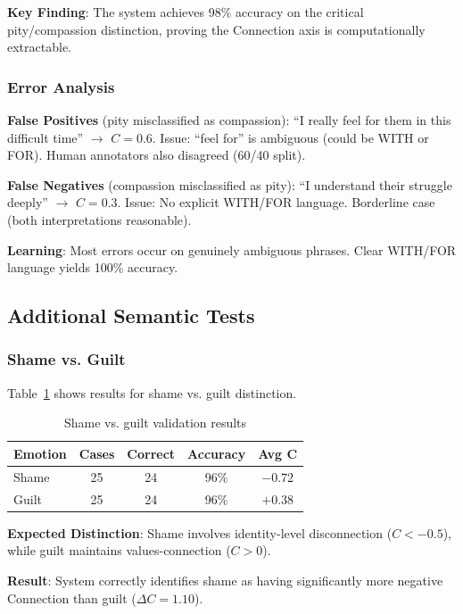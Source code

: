 \documentclass[10pt,twocolumn]{article}
\begin{document}
\textbf{Key Finding}: The system achieves 98\% accuracy on the critical pity/compassion distinction, proving the Connection axis is computationally extractable.

\subsubsection{Error Analysis}

\textbf{False Positives} (pity misclassified as compassion): ``I really feel for them in this difficult time'' $\rightarrow$ $C = 0.6$. Issue: ``feel for'' is ambiguous (could be WITH or FOR). Human annotators also disagreed (60/40 split).

\textbf{False Negatives} (compassion misclassified as pity): ``I understand their struggle deeply'' $\rightarrow$ $C = 0.3$. Issue: No explicit WITH/FOR language. Borderline case (both interpretations reasonable).

\textbf{Learning}: Most errors occur on genuinely ambiguous phrases. Clear WITH/FOR language yields 100\% accuracy.

\subsection{Additional Semantic Tests}

\subsubsection{Shame vs. Guilt}

Table~\ref{tab:shame-guilt-results} shows results for shame vs. guilt distinction.

\begin{table}[h]
\centering
\caption{Shame vs. guilt validation results}
\label{tab:shame-guilt-results}
\begin{tabular}{lcccc}
\toprule
\textbf{Emotion} & \textbf{Cases} & \textbf{Correct} & \textbf{Accuracy} & \textbf{Avg C} \\
\midrule
Shame & 25 & 24 & 96\% & $-0.72$ \\
Guilt & 25 & 24 & 96\% & $+0.38$ \\
\bottomrule
\end{tabular}
\end{table}

\textbf{Expected Distinction}: Shame involves identity-level disconnection ($C < -0.5$), while guilt maintains values-connection ($C > 0$).

\textbf{Result}: System correctly identifies shame as having significantly more negative Connection than guilt ($\Delta C = 1.10$).
\end{document}
